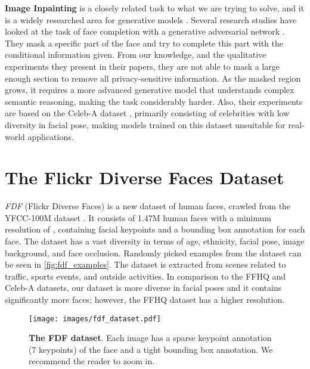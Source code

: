 \documentclass[runningheads]{llncs}
\begin{document}
\textbf{Image Inpainting} is a closely related task to what we are trying to solve, and it is a widely researched area for generative models \cite{Jo2019SC-FEGAN:Color,Li2017,Liu2018,Yeh2017}.
Several research studies have looked at the task of face completion with a generative adversarial network \cite{Li2017,Yeh2017}. They mask a specific part of the face and try to complete this part with the conditional information given.
From our knowledge, and the qualitative experiments they present in their papers, they are not able to mask a large enough section to remove all privacy-sensitive information. As the masked region grows, it requires a more advanced generative model that understands complex semantic reasoning, making the task considerably harder. 
Also, their experiments are based on the Celeb-A dataset \cite{Liu2018}, primarily consisting of celebrities with low diversity in facial pose, making models trained on this dataset unsuitable for real-world applications. 














 \section{The Flickr Diverse Faces Dataset}



\textit{FDF} (Flickr Diverse Faces) is a new dataset of human faces, crawled from the YFCC-100M dataset \cite{Thomee2015YFCC100M:Research}. It consists of 1.47M human faces with a minimum resolution of , containing facial keypoints and a bounding box annotation for each face. The dataset has a vast diversity in terms of age, ethnicity, facial pose, image background, and face occlusion. 
Randomly picked examples from the dataset can be seen in \autoref{fig:fdf_examples}.
The dataset is extracted from scenes related to traffic, sports events, and outside activities.
In comparison to the FFHQ \cite{Karras2018ANetworks} and Celeb-A \cite{Liu2018} datasets, our dataset is more diverse in facial poses and it contains significantly more faces; however, the FFHQ dataset has a higher resolution.

\begin{figure}	
	\centering
	\texttt{[image: images/fdf\_dataset.pdf]}
	\caption[Flickr Diverse Datset Examples]{\textbf{The FDF dataset}. Each image has a sparse keypoint annotation (7 keypoints) of the face and a tight bounding box annotation. We recommend the reader to zoom in.}
	\label{fig:fdf_examples}
\end{figure}
\end{document}

